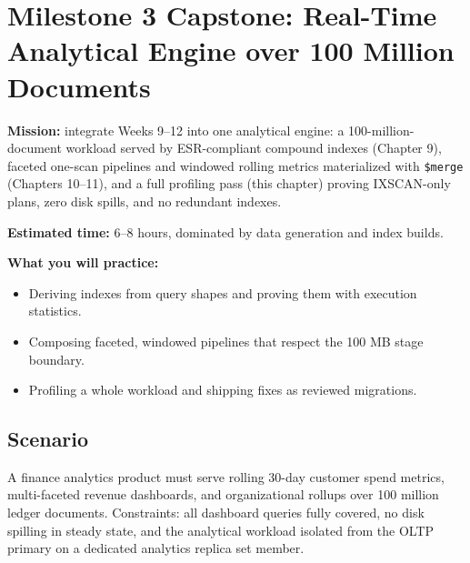 \section{Milestone 3 Capstone: Real-Time Analytical Engine over 100 Million Documents}\label{sec:ch12-capstone}

\begin{capstonebox}
\textbf{Mission:} integrate Weeks 9--12 into one analytical engine: a 100-million-document workload served by ESR-compliant compound indexes (Chapter 9), faceted one-scan pipelines and windowed rolling metrics materialized with \texttt{\$merge} (Chapters 10--11), and a full profiling pass (this chapter) proving IXSCAN-only plans, zero disk spills, and no redundant indexes.

\textbf{Estimated time:} 6--8 hours, dominated by data generation and index builds.

\textbf{What you will practice:}
\begin{itemize}
    \item Deriving indexes from query shapes and proving them with execution statistics.
    \item Composing faceted, windowed pipelines that respect the 100 MB stage boundary.
    \item Profiling a whole workload and shipping fixes as reviewed migrations.
\end{itemize}
\end{capstonebox}

\subsection*{Scenario}
A finance analytics product must serve rolling 30-day customer spend metrics, multi-faceted revenue dashboards, and organizational rollups over 100 million ledger documents. Constraints: all dashboard queries fully covered, no disk spilling in steady state, and the analytical workload isolated from the OLTP primary on a dedicated analytics replica set member.

